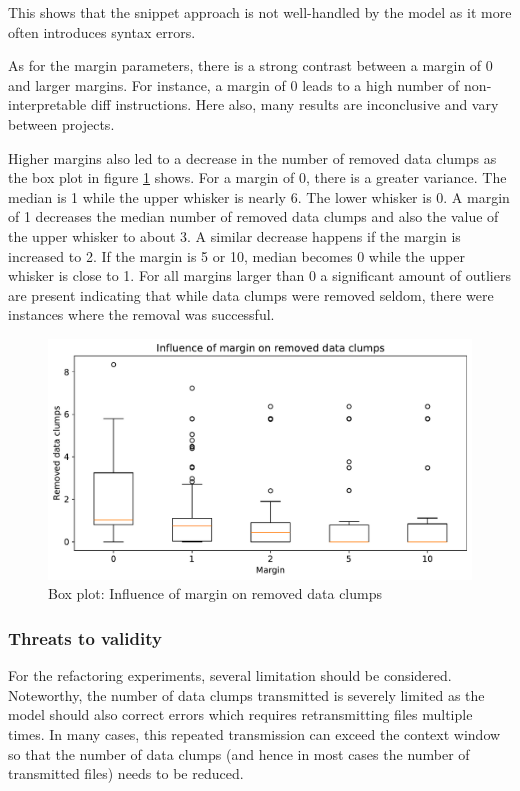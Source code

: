 This shows that the snippet approach is not well-handled by the model as it more often introduces syntax errors. 



As for the margin parameters, there is a strong contrast between a margin of 0 and larger margins. For instance, a margin of 0 leads to a high number of non-interpretable diff instructions. Here also, many results are inconclusive and vary between projects. 

Higher margins also led to a decrease in the number of removed data clumps as the box plot in figure \ref{fig:refactor_margin_removedDataClumps} shows. 
For a margin of 0, there is a greater variance. The median is 1 while the upper whisker is nearly 6. The lower whisker is 0. A margin of 1 decreases the median number of removed data clumps and also the value of the upper whisker to about 3. A similar decrease happens if the margin is increased to 2. If the margin is 5 or 10, median becomes 0 while the upper whisker is close to 1. For all margins larger than 0 a significant amount of outliers are present indicating that while data clumps were removed seldom, there were instances where the removal was successful. 
\begin{figure}
    \centering
    \includegraphics{figures/chapter5/refactor_margin_removed_data_clumps.pdf}
    \caption{Box plot: Influence of margin on removed data clumps}
    \label{fig:refactor_margin_removedDataClumps}
\end{figure}

\subsubsection{Threats to validity}

For the refactoring experiments, several limitation should be considered. Noteworthy, the number of data clumps transmitted is severely limited as the model should also correct errors which requires retransmitting files multiple times. In many cases, this repeated transmission can exceed the context window so that the number of data clumps (and hence in most cases the number of transmitted files)  needs to be reduced. 

